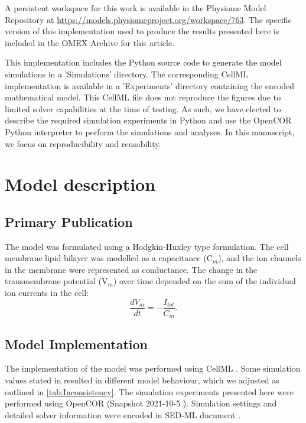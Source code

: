 \documentclass[fleqn,10pt]{physiome}
\begin{document}
A persistent workspace for this work is available in the Physiome Model Repository at \url{https://models.physiomeproject.org/workspace/763}. The specific version of this implementation used to produce the results presented here is included in the OMEX Archive \citep{bergmann_combine_2014} for this article.

This implementation includes the Python source code to generate the model simulations in a 'Simulations' directory. The corresponding CellML implementation is available in a 'Experiments' directory containing the encoded mathematical model. This CellML file does not reproduce the figures due to limited solver capabilities at the time of testing. As such, we have elected to describe the required simulation experiments in Python and use the OpenCOR \citep{garny_opencor:_2015} Python interpreter to perform the simulations and analyses. In this manuscript, we focus on reproducibility and reusability. 


\section{Model description}
\subsection{Primary Publication}
The model was formulated using a Hodgkin-Huxley type formulation. The cell membrane lipid bilayer was modelled as a capacitance (C$_{m}$),
and the ion channels in the membrane were represented as conductance. The change in the transmembrane potential (V$_{m}$) over time depended on the sum of the individual ion currents in the cell:
\begin{equation}
\frac{dV_{m}}{dt} = - \frac{I_{tot}}{C_{m}}.   
\end{equation}



\subsection{Model Implementation}
The implementation of the model was performed using CellML \citep{doi:10.1177/0037549703040939}. Some simulation values stated in \citet{imtiaz2002theoretical} resulted in different model behaviour, which we adjusted as outlined in \autoref{tab:Inconsistency}. The simulation experiments presented here were performed using OpenCOR (Snapshot 2021-10-5 \citep{garny_opencor:_2015}). Simulation settings and detailed solver information were encoded in SED-ML ducument \citep{waltemath2011reproducible}. 
\end{document}
